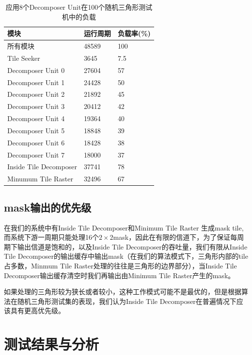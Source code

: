 \begin{table}[ht]
    \caption{\label{tab:100 random triangles with 8 decomposer unit}应用8个Decomposer Unit在100个随机三角形测试机中的负载}
    \begin{tabularx}{\linewidth}{|XXX|}
        \hline
        模块 & 运行周期 & 负载率(\%) \\ \hline
        所有模块 & 48589 & 100 \\ \hline
        Tile Seeker & 3645 & 7.5  \\ \hline
        Decomposer Unit 0 & 27604 & 57  \\ \hline
        Decomposer Unit 1 & 24428 & 50  \\ \hline
        Decomposer Unit 2 & 21892 & 45  \\ \hline
        Decomposer Unit 3 & 20412 & 42  \\ \hline
        Decomposer Unit 4 & 19364 & 40  \\ \hline
        Decomposer Unit 5 & 18848 & 39  \\ \hline
        Decomposer Unit 6 & 18428 & 38  \\ \hline
        Decomposer Unit 7 & 18000 & 37  \\ \hline
        Inside Tile Decomposer & 37741 & 78 \\ \hline
        Minumum Tile Raster & 32496 & 67 \\ \hline
    \end{tabularx}
\end{table}

\subsection{mask输出的优先级}
在我们的系统中有Inside Tile Decomposer和Minimum Tile Raster 生成mask tile,而系统下游一周期只能处理16个$2\times 2$mask，因此在有限的信道下，为了保证每周期下输出信道是饱和的，以及Inside Tile Decomposer的吞吐量，我们有限从Inside Tile Decomposer的输出缓存中输出mask（在我们的算法模式下，三角形内部的tile占多数，Minmum Tile Raster处理的往往是三角形的边界部分），当Inside Tile Decomposer输出缓存清空时我们再输出由Minimum Tile Raster产生的mask。

如果处理的三角形较为狭长或者较小，这种工作模式可能不是最优的，但是根据算法在随机三角形测试集的表现，我们认为Inside Tile Decomposer在普遍情况下应该具有更高优先级。


\section{测试结果与分析}
\label{section:result}
